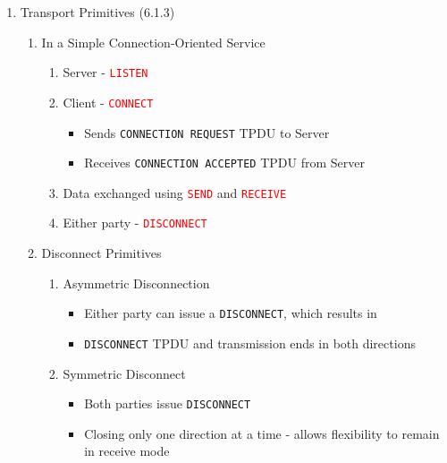 \documentclass[a4paper,10pt]{article}
\newcommand{\red}[1]{\textcolor{red}{#1}}
\begin{document}
\begin{enumerate}
  \item Transport Primitives (6.1.3)
    \begin{enumerate}
      \item In a Simple Connection-Oriented Service
        \begin{enumerate}
          \item Server - \red{\texttt{LISTEN}}
          \item Client - \red{\texttt{CONNECT}}
            \begin{itemize}
              \item Sends \texttt{CONNECTION REQUEST} TPDU to Server
              \item Receives \texttt{CONNECTION ACCEPTED} TPDU from Server
            \end{itemize}
          \item Data exchanged using \red{\texttt{SEND}} and \red{\texttt{RECEIVE}}
          \item Either party - \red{\texttt{DISCONNECT}}
        \end{enumerate}
      \item Disconnect Primitives
        \begin{enumerate}
          \item Asymmetric Disconnection
            \begin{itemize}
              \item Either party can issue a \texttt{DISCONNECT}, which results in
              \item \texttt{DISCONNECT} TPDU and transmission ends in both directions
            \end{itemize}
          \item Symmetric Disconnect
            \begin{itemize}
              \item Both parties issue \texttt{DISCONNECT}
              \item Closing only one direction at a time - allows flexibility to remain in receive mode
            \end{itemize}
        \end{enumerate}
    \end{enumerate}


\end{enumerate}
\end{document}
